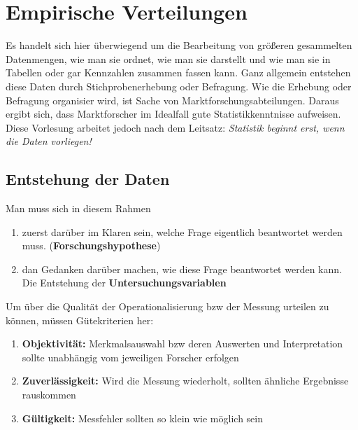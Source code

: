 \chapter{Empirische Verteilungen}
Es handelt sich hier überwiegend um die Bearbeitung von größeren gesammelten Datenmengen, wie man sie ordnet, wie man sie darstellt und wie man sie in Tabellen oder gar Kennzahlen zusammen fassen kann.
Ganz allgemein entstehen diese Daten durch Stichprobenerhebung oder Befragung. Wie die Erhebung oder Befragung organisier wird, ist Sache von Marktforschungsabteilungen.
Daraus ergibt sich, dass Marktforscher im Idealfall gute Statistikkenntnisse aufweisen. Diese Vorlesung arbeitet jedoch nach dem Leitsatz: \textit{Statistik beginnt erst, wenn die Daten vorliegen!}

\section{Entstehung der Daten}
Man muss sich in diesem Rahmen
\begin{enumerate}
    \item zuerst darüber im Klaren sein, welche Frage eigentlich beantwortet werden muss. (\textbf{Forschungshypothese})
    \item dan Gedanken darüber machen, wie diese Frage beantwortet werden kann. Die Entstehung der \textbf{Untersuchungsvariablen}
\end{enumerate}
Um über die Qualität der Operationalisierung bzw der Messung urteilen zu können, müssen Gütekriterien her:
\begin{enumerate}
    \item \textbf{Objektivität:} Merkmalsauswahl bzw deren Auswerten und Interpretation sollte unabhängig vom jeweiligen Forscher erfolgen
    \item \textbf{Zuverlässigkeit:} Wird die Messung wiederholt, sollten ähnliche Ergebnisse rauskommen
    \item \textbf{Gültigkeit:} Messfehler sollten so klein wie möglich sein
\end{enumerate}

